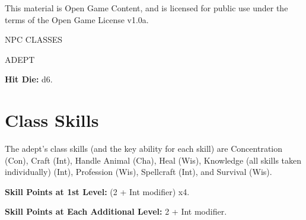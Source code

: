 \documentclass{article}
\begin{document}
This material is Open Game Content, and is licensed for public use under the terms 
of the Open Game License v1.0a.

{\LARGE{}NPC CLASSES}

\vspace{12pt}
ADEPT

\textbf{Hit Die:} d6.

\section*{\textbf{Class Skills}}

The adept's class skills (and the key ability for each skill) are Concentration 
(Con), Craft (Int), Handle Animal (Cha), Heal (Wis), Knowledge (all skills taken 
individually) (Int), Profession (Wis), Spellcraft (Int), and Survival (Wis). 

\textbf{Skill Points at 1st Level:} (2 + Int modifier) x4.

\textbf{Skill Points at Each Additional Level:} 2 + Int modifier.
\end{document}
